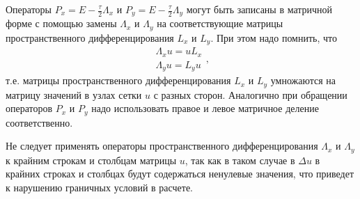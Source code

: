 Операторы $P_x = E - \frac{\tau}{2} \Lambda_x$ и $P_y = E - \frac{\tau}{2} \Lambda_y$ могут быть записаны в матричной форме с помощью замены $\Lambda_x$ и $\Lambda_y$ на соответствующие матрицы пространственного дифференцирования $L_x$ и $L_y$. При этом надо помнить, что
\begin{equation} \label{c10eq3}
	\begin{split}
		\Lambda_x u = u L_x \\
		\Lambda_y u = L_y u
	\end{split},
\end{equation}
т.е. матрицы пространственного дифференцирования $L_x$ и $L_y$ умножаются на матрицу значений в узлах сетки $u$ с  разных сторон. Аналогично при обращении операторов $P_x$ и $P_y$ надо использовать правое и левое матричное деление соответственно.

Не следует применять операторы пространственного дифференцирования $\Lambda_x$ и $\Lambda_y$ к крайним строкам и столбцам матрицы $u$, так как в таком случае в $\Delta u$ в крайних строках и столбцах будут содержаться ненулевые значения, что приведет к нарушению граничных условий в расчете.


